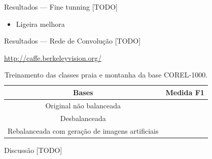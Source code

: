 \documentclass{beamer}
\begin{document}
\begin{frame}{Resultados --- Fine tunning}
  \setlength\leftmargini{1em}
  [TODO]
  \begin{itemize}
    \item Ligeira melhora
  \end{itemize}
\end{frame}
\begin{frame}{Resultados --- Rede de Convolução}
  \setlength\leftmargini{1em}
  [TODO]
  \begin{table}
    \url{http://caffe.berkeleyvision.org/}
    \caption{Treinamento das classes praia e montanha da base COREL-1000.}
    \begin{tabular}{c|c}
      Bases    &   Medida F1 \\ \hline
      Original não balanceada     &     \\
      Desbalanceada &     \\
      Rebalanceada com geração de imagens artificiais &     \\
    \end{tabular}
  \end{table}
\end{frame}
\begin{frame}{Discussão}
  [TODO]
\end{frame}
\end{document}
